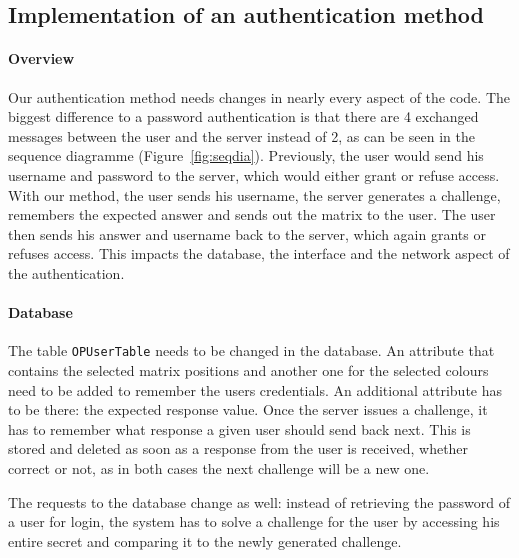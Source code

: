 \documentclass[11pt,a4paper]{article}
\begin{document}
\clearpage

\subsection*{Implementation of an authentication method}
\paragraph{Overview}
Our authentication method needs changes in nearly every aspect of the code. The biggest difference to a password authentication is that there are 4 exchanged messages between the user and the server instead of 2, as can be seen in the sequence diagramme (Figure~\ref{fig:seqdia}). Previously, the user would send his username and password to the server, which would either grant or refuse access. With our method, the user sends his username, the server generates a challenge, remembers the expected answer and sends out the matrix to the user. The user then sends his answer and username back to the server, which again grants or refuses access. This impacts the database, the interface and the network aspect of the authentication.

\paragraph{Database}
The table \texttt{OPUserTable} needs to be changed in the database.
An attribute that contains the selected matrix positions and another one for the selected colours need to be added to remember the users credentials.
An additional attribute has to be there: the expected response value. Once the server issues a challenge, it has to remember what response a given user should send back next. This is stored and deleted as soon as a response from the user is received, whether correct or not, as in both cases the next challenge will be a new one.

The requests to the database change as well: instead of retrieving the password of a user for login, the system has to solve a challenge for the user by accessing his entire secret and comparing it to the newly generated challenge.
\end{document}
